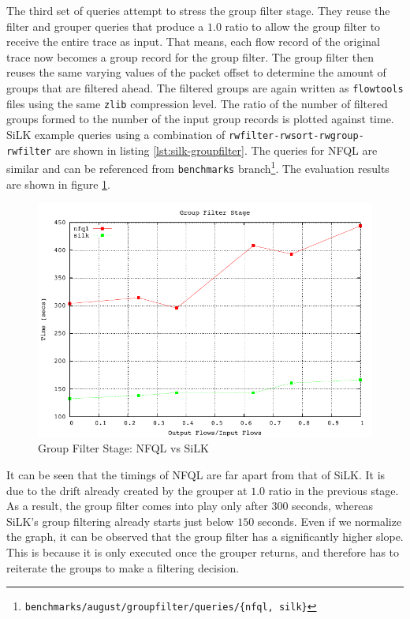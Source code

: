 The third set of queries attempt to stress the group filter stage. They reuse
the filter and grouper queries that produce a $1.0$ ratio to allow the group
filter to receive the entire trace as input. That means, each flow record of
the original trace now becomes a group record for the group filter.  The group
filter then reuses the same varying values of the packet offset to determine
the amount of groups that are filtered ahead. The filtered groups
 are again written as \texttt{flowtools}
files using the same \texttt{zlib} compression level. The ratio of the number
of filtered groups formed to the number of the input group records is plotted
against time. SiLK example queries using a combination of
\texttt{rwfilter-rwsort-rwgroup-rwfilter} are shown in listing
\ref{lst:silk-groupfilter}.  The queries for \ac{NFQL} are similar and can be
referenced from \texttt{benchmarks}
branch\footnote{\texttt{benchmarks/august/groupfilter/queries/\{nfql,
silk\}}}.  The evaluation results are shown in figure
\ref{fig:benchmarks-groupfilter}.

\begin{figure}[ht!]
  \begin{center}
    \includegraphics* [width=0.8\linewidth]{figures/benchmarks/groupfilter}
    \caption{Group Filter Stage: NFQL vs SiLK}
    \label{fig:benchmarks-groupfilter}
  \end{center}
\end{figure}

It can be seen that the timings of \ac{NFQL} are far apart from that of SiLK.
It is due to the drift already created by the grouper at $1.0$ ratio in the
previous stage.  As a result,
the group filter comes into play only after $300$ seconds, whereas SiLK's
group filtering already starts just below $150$ seconds. Even if we normalize
the graph, it can be observed that the group filter has a significantly higher
slope. This is because it is only executed once the grouper returns, and
therefore has to reiterate the groups to make a filtering decision.

